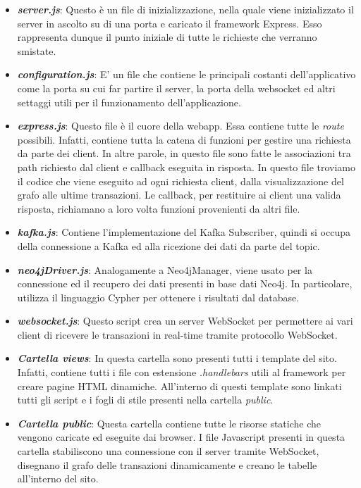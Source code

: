 \begin{itemize}
\item  \textbf{\textit{server.js}}: Questo è un file di inizializzazione, nella quale viene inizializzato il server in ascolto su di una porta e caricato il framework Express. Esso rappresenta dunque il punto iniziale di tutte le richieste che verranno smistate.
\item  \textbf{\textit{configuration.js}}: E' un file che contiene le principali costanti dell'applicativo come la porta su cui far partire il server, la porta della websocket ed altri settaggi utili per il funzionamento dell'applicazione.
\item  \textbf{\textit{express.js}}: Questo file è il cuore della webapp. Essa contiene tutte le \textit{route} possibili. Infatti, contiene tutta la catena di funzioni per gestire una richiesta da parte dei client. In altre parole, in questo file sono fatte le associazioni tra path richiesto dal client e callback eseguita in risposta. In questo file troviamo il codice che viene eseguito ad ogni richiesta client, dalla visualizzazione del grafo alle ultime transazioni. Le callback, per restituire ai client una valida risposta, richiamano a loro volta funzioni provenienti da altri file.
\item  \textbf{\textit{kafka.js}}: Contiene l'implementazione del Kafka Subscriber, quindi si occupa della connessione a Kafka ed alla ricezione dei dati da parte del topic.
\item  \textbf{\textit{neo4jDriver.js}}: Analogamente a Neo4jManager, viene usato per la connessione ed il recupero dei dati presenti in base dati Neo4j. In particolare, utilizza il linguaggio Cypher per ottenere i risultati dal database. 
\item  \textbf{\textit{websocket.js}}: Questo script crea un server WebSocket per permettere ai vari client di ricevere le transazioni in real-time tramite protocollo WebSocket.
\item  \textbf{\textit{Cartella views}}: In questa cartella sono presenti tutti i template del sito. Infatti, contiene tutti i file con estensione \textit{.handlebars} utili al framework per creare pagine HTML dinamiche. All'interno di questi template sono linkati tutti gli script e i fogli di stile presenti nella cartella \textit{public}.
\item  \textbf{\textit{Cartella public}}: Questa cartella contiene tutte le risorse statiche che vengono caricate ed eseguite dai browser. I file Javascript presenti in questa cartella stabiliscono una connessione con il server tramite WebSocket, disegnano il grafo delle transazioni dinamicamente e creano le tabelle all'interno del sito.

\end{itemize}
